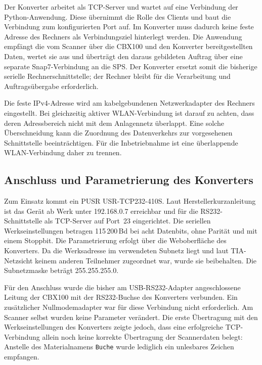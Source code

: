 Der Konverter arbeitet als TCP-Server und wartet auf eine Verbindung der Python-Anwendung. Diese übernimmt die Rolle des Clients und baut die Verbindung zum konfigurierten Port auf. Im Konverter muss dadurch keine feste Adresse des Rechners als Verbindungsziel hinterlegt werden. Die Anwendung empfängt die vom Scanner über die CBX100 und den Konverter bereitgestellten Daten, wertet sie aus und überträgt den daraus gebildeten Auftrag über eine separate Snap7-Verbindung an die SPS. Der Konverter ersetzt somit die bisherige serielle Rechnerschnittstelle; der Rechner bleibt für die Verarbeitung und Auftragsübergabe erforderlich.

Die feste IPv4-Adresse wird am kabelgebundenen Netzwerkadapter des Rechners eingestellt. Bei gleichzeitig aktiver WLAN-Verbindung ist darauf zu achten, dass deren Adressbereich nicht mit dem Anlagennetz überlappt. Eine solche Überschneidung kann die Zuordnung des Datenverkehrs zur vorgesehenen Schnittstelle beeinträchtigen. Für die Inbetriebnahme ist eine überlappende WLAN-Verbindung daher zu trennen.

\subsection{Anschluss und Parametrierung des Konverters}
\label{sec:qr_konfig}

Zum Einsatz kommt ein PUSR USR-TCP232-410S. Laut Herstellerkurzanleitung ist das Gerät ab Werk unter 192.168.0.7 erreichbar und für die RS232-Schnittstelle als TCP-Server auf Port~23 eingerichtet. Die seriellen Werkseinstellungen betragen 115\,200\,Bd bei acht Datenbits, ohne Parität und mit einem Stoppbit. Die Parametrierung erfolgt über die Weboberfläche des Konverters. \cite{usr410s_quickstart} Da die Werksadresse im verwendeten Subnetz liegt und laut TIA-Netzsicht keinem anderen Teilnehmer zugeordnet war, wurde sie beibehalten. Die Subnetzmaske beträgt 255.255.255.0.

Für den Anschluss wurde die bisher am USB-RS232-Adapter angeschlossene Leitung der CBX100 mit der RS232-Buchse des Konverters verbunden. Ein zusätzlicher Nullmodemadapter war für diese Verbindung nicht erforderlich. Am Scanner selbst wurden keine Parameter verändert. Die erste Übertragung mit den Werkseinstellungen des Konverters zeigte jedoch, dass eine erfolgreiche TCP-Verbindung allein noch keine korrekte Übertragung der Scannerdaten belegt: Anstelle des Materialnamens \texttt{Buche} wurde lediglich ein unlesbares Zeichen empfangen.

